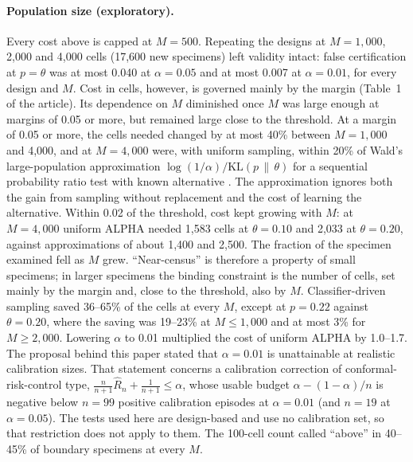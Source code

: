 \documentclass[11pt]{article}
\theoremstyle{remark}
\theoremstyle{definition}
\begin{document}
\paragraph{Population size (exploratory).} Every cost above is capped at $M=500$. Repeating the designs at $M=1{,}000$, 2,000 and 4,000 cells (17,600 new specimens) left validity intact: false certification at $p=\theta$ was at most 0.040 at $\alpha=0.05$ and at most 0.007 at $\alpha=0.01$, for every design and $M$. Cost in cells, however, is governed mainly by the margin (Table~1 of the article). Its dependence on $M$ diminished once $M$ was large enough at margins of 0.05 or more, but remained large close to the threshold. At a margin of 0.05 or more, the cells needed changed by at most 40\% between $M=1{,}000$ and 4,000, and at $M=4{,}000$ were, with uniform sampling, within 20\% of Wald's large-population approximation $\log(1/\alpha)/\mathrm{KL}(p\,\|\,\theta)$ for a sequential probability ratio test with known alternative \cite{wald1945}. The approximation ignores both the gain from sampling without replacement and the cost of learning the alternative. Within 0.02 of the threshold, cost kept growing with $M$: at $M=4{,}000$ uniform ALPHA needed 1,583 cells at $\theta=0.10$ and 2,033 at $\theta=0.20$, against approximations of about 1,400 and 2,500. The fraction of the specimen examined fell as $M$ grew. ``Near-census'' is therefore a property of small specimens; in larger specimens the binding constraint is the number of cells, set mainly by the margin and, close to the threshold, also by $M$. Classifier-driven sampling saved 36--65\% of the cells at every $M$, except at $p=0.22$ against $\theta=0.20$, where the saving was 19--23\% at $M\le1{,}000$ and at most 3\% for $M\ge2{,}000$. Lowering $\alpha$ to 0.01 multiplied the cost of uniform ALPHA by 1.0--1.7. The proposal behind this paper stated that $\alpha=0.01$ is unattainable at realistic calibration sizes. That statement concerns a calibration correction of conformal-risk-control type, $\tfrac{n}{n+1}\hat R_n+\tfrac{1}{n+1}\le\alpha$, whose usable budget $\alpha-(1-\alpha)/n$ is negative below $n=99$ positive calibration episodes at $\alpha=0.01$ (and $n=19$ at $\alpha=0.05$). The tests used here are design-based and use no calibration set, so that restriction does not apply to them. The 100-cell count called ``above'' in 40--45\% of boundary specimens at every $M$.
\end{document}
